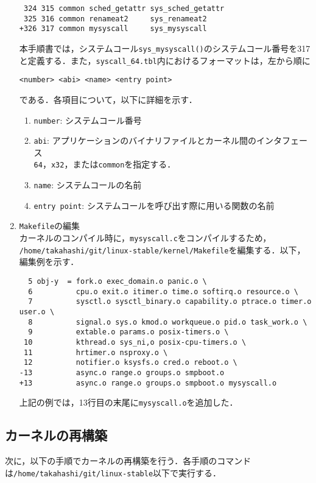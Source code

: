 \documentclass[12pt]{jsarticle}
\begin{document}
\begin{enumerate}
\begin{verbatim}
 324 315 common sched_getattr sys_sched_getattr
 325 316 common renameat2     sys_renameat2
+326 317 common mysyscall     sys_mysyscall
\end{verbatim}
本手順書では，システムコール\verb|sys_mysyscall()|のシステムコール番号を317と定義する．また，\verb|syscall_64.tbl|内におけるフォーマットは，左から順に 

\begin{verbatim}
<number> <abi> <name> <entry point>
\end{verbatim}
である．各項目について，以下に詳細を示す．

\begin{enumerate}
\item \verb|number|: システムコール番号
\item \verb|abi|: アプリケーションのバイナリファイルとカーネル間のインタフェース\\
  \verb|64|，\verb|x32|，または\verb|common|を指定する．
\item \verb|name|: システムコールの名前
\item \verb|entry point|: システムコールを呼び出す際に用いる関数の名前
\end{enumerate}

\item \verb|Makefile|の編集\\
  カーネルのコンパイル時に，\verb|mysyscall.c|をコンパイルするため，\\
  \verb|/home/takahashi/git/linux-stable/kernel/Makefile|を編集する．以下，編集例を示す．
\begin{verbatim}
  5 obj-y  = fork.o exec_domain.o panic.o \
  6          cpu.o exit.o itimer.o time.o softirq.o resource.o \
  7          sysctl.o sysctl_binary.o capability.o ptrace.o timer.o user.o \
  8          signal.o sys.o kmod.o workqueue.o pid.o task_work.o \
  9          extable.o params.o posix-timers.o \
 10          kthread.o sys_ni,o posix-cpu-timers.o \ 
 11          hrtimer.o nsproxy.o \
 12          notifier.o ksysfs.o cred.o reboot.o \
-13          async.o range.o groups.o smpboot.o 
+13          async.o range.o groups.o smpboot.o mysyscall.o
\end{verbatim}

上記の例では，13行目の末尾に\verb|mysyscall.o|を追加した．
\end{enumerate}

\subsection{カーネルの再構築}
次に，以下の手順でカーネルの再構築を行う．各手順のコマンドは\verb|/home/takahashi/git/linux-stable|以下で実行する．
\end{document}
